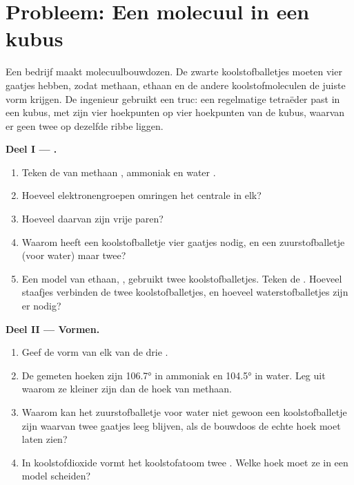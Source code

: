 \section{Probleem: Een molecuul in een kubus}

\begin{problem}
\label{pb:g10:lewis-and-shape:1}
Een bedrijf maakt molecuulbouwdozen. De zwarte koolstofballetjes moeten
vier gaatjes hebben, zodat methaan, ethaan en de andere
koolstofmoleculen de juiste vorm krijgen. De ingenieur gebruikt een
truc: een regelmatige tetraëder past in een kubus, met zijn vier
hoekpunten op vier hoekpunten van de kubus, waarvan er geen twee op
dezelfde ribbe liggen.

\medskip
\noindent\textbf{Deel I --- .}
\begin{enumerate}
  \item Teken de  van methaan , ammoniak 
        en water .
  \item Hoeveel elektronengroepen omringen het centrale  in elk?
  \item Hoeveel daarvan zijn vrije paren?
  \item Waarom heeft een koolstofballetje vier gaatjes nodig, en een
        zuurstofballetje (voor water) maar twee?
  \item Een model van ethaan, , gebruikt twee
        koolstofballetjes. Teken de . Hoeveel staafjes
        verbinden de twee koolstofballetjes, en hoeveel
        waterstofballetjes zijn er nodig?
\end{enumerate}

\medskip
\noindent\textbf{Deel II --- Vormen.}
\begin{enumerate}[resume]
  \item Geef de vorm van elk van de drie .
  \item De gemeten hoeken zijn \ang{106.7} in ammoniak en \ang{104.5} in
        water. Leg uit waarom ze kleiner zijn dan de hoek van methaan.
  \item Waarom kan het zuurstofballetje voor water niet gewoon een
        koolstofballetje zijn waarvan twee gaatjes leeg blijven, als de
        bouwdoos de echte hoek moet laten zien?
  \item In koolstofdioxide vormt het koolstofatoom twee . Welke hoek moet ze in een model scheiden?
\end{enumerate}


\end{problem}
